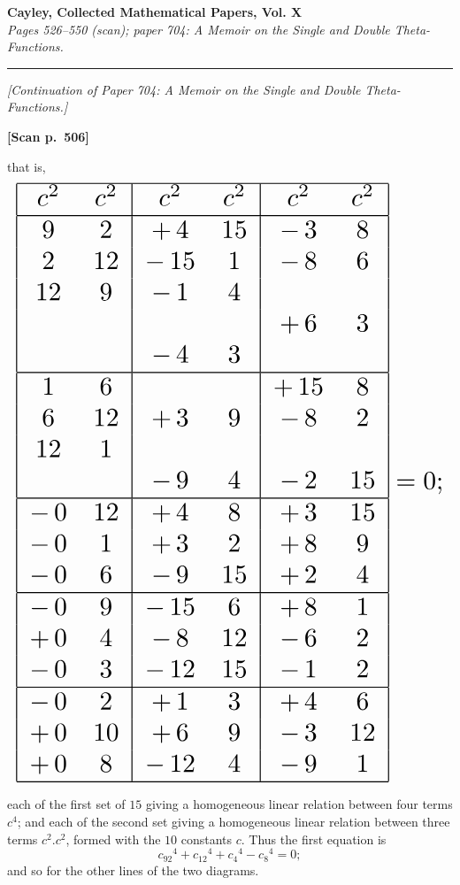 \documentclass[11pt]{article}
\begin{document}
\begin{center}
\textbf{\large Cayley, Collected Mathematical Papers, Vol. X}\\[2pt]
\textit{Pages 526--550 (scan); paper 704: A Memoir on the Single and Double Theta-Functions.}
\end{center}

\bigskip
\hrule
\bigskip

\noindent\textit{[Continuation of Paper 704: A Memoir on the Single and Double Theta-Functions.]}

\bigskip

\noindent\textbf{[Scan p.~506]}

\medskip

\noindent that is,
\[
\resizebox{\textwidth}{!}{$\displaystyle
\begin{array}{|cc|cc|cc|}
\hline
c^2 & c^2 & c^2 & c^2 & c^2 & c^2 \\ \hline
9   & 2  & +\,4   & 15 & -\,3  & 8 \\
2   & 12 & -\,15  & 1  & -\,8  & 6 \\
12  & 9  & -\,1   & 4  &       &   \\
    &    &        &    & +\,6  & 3 \\
    &    & -\,4   & 3  &       &   \\
\hline
1   & 6  &        &    & +\,15 & 8 \\
6   & 12 & +\,3   & 9  & -\,8  & 2 \\
12  & 1  &        &    &       &   \\
    &    & -\,9   & 4  & -\,2  & 15 \\
\hline
-\,0 & 12 & +\,4 & 8 & +\,3 & 15 \\
-\,0 & 1  & +\,3 & 2 & +\,8 & 9 \\
-\,0 & 6  & -\,9 & 15& +\,2 & 4 \\
\hline
-\,0 & 9  & -\,15 & 6 & +\,8 & 1 \\
+\,0 & 4  & -\,8  & 12& -\,6 & 2 \\
-\,0 & 3  & -\,12 & 15& -\,1 & 2 \\
\hline
-\,0 & 2  & +\,1  & 3 & +\,4 & 6 \\
+\,0 & 10 & +\,6  & 9 & -\,3 & 12 \\
+\,0 & 8  & -\,12 & 4 & -\,9 & 1 \\
\hline
\end{array} = 0; $}
\]

each of the first set of $15$ giving a homogeneous linear relation between four terms $c^4$; and each of the second set giving a homogeneous linear relation between three terms $c^2.c^2$, formed with the $10$ constants $c$. Thus the first equation is
\[
c_{92}{}^4 + c_{12}{}^4 + c_4{}^4 - c_8{}^4 = 0;
\]
and so for the other lines of the two diagrams.
\end{document}
